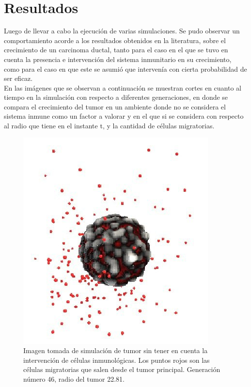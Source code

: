 \documentclass[12pt]{amsart}
\begin{document}
\section{Resultados}
Luego de llevar a cabo la ejecuci\'on de varias simulaciones. Se pudo observar un comportamiento acorde a los resultados obtenidos en la literatura, sobre el crecimiento de un carcinoma ductal, tanto para el caso en el que se tuvo en cuenta la presencia e intervenci\'on del sistema inmunitario en su crecimiento, como para el caso en que este se asumi\'o que interven\'ia con cierta probabilidad de ser eficaz. \\

En las im\'agenes que se observan a continuaci\'on se muestran cortes en cuanto al tiempo en la simulaci\'on con respecto a diferentes generaciones, en donde se compara el crecimiento del tumor en un ambiente donde no se considera el sistema inmune como un factor a valorar y en el que si se considera con respecto al radio que tiene en el instante t, y la cantidad de c\'elulas migratorias.

\begin{figure}[htb]
\includegraphics[scale=0.7]{img/no_inm.jpg}
\caption{Imagen tomada de simulaci\'on de tumor sin tener en cuenta la intervenci\'on de c\'elulas inmunol\'ogicas. Los puntos rojos son las c\'elulas migratorias que salen desde el tumor principal. Generaci\'on n\'umero 46, radio del tumor 22.81.}
\end{figure}
\end{document}
